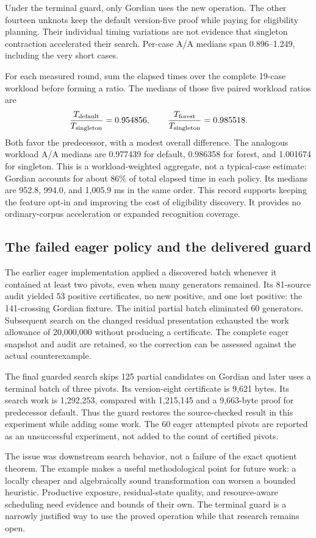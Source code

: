 Under the terminal guard, only Gordian uses the new operation. The other
fourteen unknots keep the default version-five proof while paying for
eligibility planning. Their individual timing variations are not evidence
that singleton contraction accelerated their search. Per-case A/A medians
span 0.896--1.249, including the very short cases.

For each measured round, sum the elapsed times over the complete 19-case
workload before forming a ratio. The medians of those five paired workload
ratios are
\[
 \frac{T_{\rm default}}{T_{\rm singleton}}=0.954856,
 \qquad
 \frac{T_{\rm forest}}{T_{\rm singleton}}=0.985518.
\]
Both favor the predecessor, with a modest overall difference. The analogous
workload A/A medians are 0.977439 for default, 0.986358 for forest, and
1.001674 for singleton. This is a workload-weighted aggregate, not a
typical-case estimate: Gordian accounts for about 86\% of total elapsed
time in each policy. Its medians
are 952.8, 994.0, and 1,005.9 ms in the same order. This record supports
keeping the feature opt-in and improving the cost of eligibility discovery.
It provides no ordinary-corpus acceleration or expanded recognition coverage.

\subsection{The failed eager policy and the delivered guard}

The earlier eager implementation applied a discovered batch whenever it
contained at least two pivots, even when many generators remained. Its
81-source audit yielded 53 positive certificates, no new positive, and
one lost positive: the 141-crossing Gordian fixture. The initial partial
batch eliminated 60 generators. Subsequent search on the changed residual
presentation exhausted the work allowance of 20,000,000 without producing
a certificate. The complete eager snapshot and audit are retained, so
the correction can be assessed against the actual counterexample.

The final guarded search skips 125 partial candidates on Gordian and later
uses a terminal batch of three pivots. Its version-eight certificate is
9,621 bytes. Its search work is 1,292,253, compared with 1,215,145 and a
9,663-byte proof for predecessor default. Thus the guard restores the
source-checked result in this experiment while adding some work. The 60
eager attempted pivots are reported as an unsuccessful experiment, not
added to the count of certified pivots.

The issue was downstream search behavior, not a failure of the exact
quotient theorem. The example makes a useful methodological point for
future work: a locally cheaper and algebraically sound transformation
can worsen a bounded heuristic. Productive exposure, residual-state
quality, and resource-aware scheduling need evidence and bounds of their
own. The terminal guard is a narrowly justified way to use the proved
operation while that research remains open.
